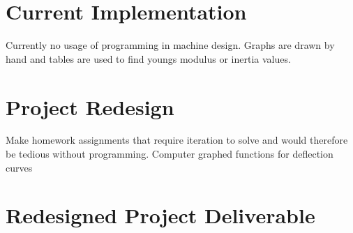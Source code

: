 \section{Current Implementation}
Currently no usage of programming in machine design. Graphs are drawn 
by hand and tables are used to find youngs modulus or inertia values.

\section{Project Redesign}
Make homework assignments that require iteration to solve and would 
therefore be tedious without programming. Computer graphed functions 
for deflection curves

\section{Redesigned Project Deliverable}
